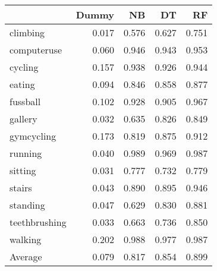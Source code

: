 \begin{tabular}{lrrrr}
\toprule
{} &  Dummy &    NB &    DT &    RF \\
\midrule
climbing      &  0.017 & 0.576 & 0.627 & 0.751 \\
computeruse   &  0.060 & 0.946 & 0.943 & 0.953 \\
cycling       &  0.157 & 0.938 & 0.926 & 0.944 \\
eating        &  0.094 & 0.846 & 0.858 & 0.877 \\
fussball      &  0.102 & 0.928 & 0.905 & 0.967 \\
gallery       &  0.032 & 0.635 & 0.826 & 0.849 \\
gymcycling    &  0.173 & 0.819 & 0.875 & 0.912 \\
running       &  0.040 & 0.989 & 0.969 & 0.987 \\
sitting       &  0.031 & 0.777 & 0.732 & 0.779 \\
stairs        &  0.043 & 0.890 & 0.895 & 0.946 \\
standing      &  0.047 & 0.629 & 0.830 & 0.881 \\
teethbrushing &  0.033 & 0.663 & 0.736 & 0.850 \\
walking       &  0.202 & 0.988 & 0.977 & 0.987 \\
Average       &  0.079 & 0.817 & 0.854 & 0.899 \\
\bottomrule
\end{tabular}
